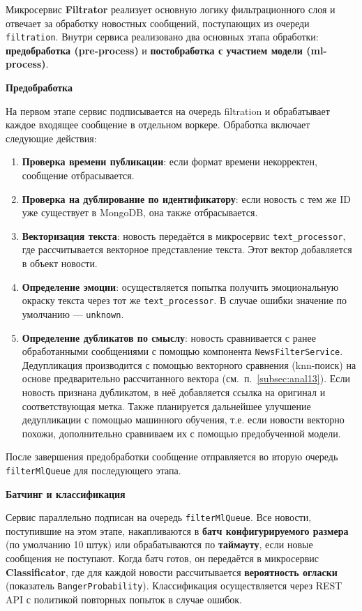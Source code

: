 Микросервис \textbf{Filtrator} реализует основную логику фильтрационного слоя и отвечает за обработку новостных сообщений, поступающих из очереди \texttt{filtration}.
Внутри сервиса реализовано два основных этапа обработки: \textbf{предобработка (pre-process)} и \textbf{постобработка с участием модели (ml-process)}.

\textbf{Предобработка}

На первом этапе сервис подписывается на очередь filtration и обрабатывает каждое входящее сообщение в отдельном воркере. Обработка включает следующие действия:
\begin{enumerate}
    \item \textbf{Проверка времени публикации}: если формат времени некорректен, сообщение отбрасывается.
    \item \textbf{Проверка на дублирование по идентификатору}: если новость с тем же ID уже существует в MongoDB, она также отбрасывается.
    \item \textbf{Векторизация текста}: новость передаётся в микросервис \texttt{text\_processor}, где рассчитывается векторное представление текста. Этот вектор добавляется в объект новости.
    \item \textbf{Определение эмоции}: осуществляется попытка получить эмоциональную окраску текста через тот же \texttt{text\_processor}. В случае ошибки значение по умолчанию — \texttt{unknown}.
    \item \textbf{Определение дубликатов по смыслу}: новость сравнивается с ранее обработанными сообщениями с помощью компонента \texttt{NewsFilterService}.
    Дедупликация производится с помощью векторного сравнения (knn-поиск) на основе предварительно рассчитанного вектора (см.\ п.~\ref{subsec:anal13}).
    Если новость признана дубликатом, в неё добавляется ссылка на оригинал и соответствующая метка.
    Также планируется дальнейшее улучшение дедупликации с помощью машинного обучения, т.е. если новости векторно похожи, дополнительно сравниваем их с помощью предобученной модели.
\end{enumerate}

После завершения предобработки сообщение отправляется во вторую очередь \texttt{filterMlQueue} для последующего этапа.

\textbf{Батчинг и классификация}

Сервис параллельно подписан на очередь \texttt{filterMlQueue}.
Все новости, поступившие на этом этапе, накапливаются в \textbf{батч конфигурируемого размера} (по умолчанию 10 штук) или обрабатываются по \textbf{таймауту}, если новые сообщения не поступают.
Когда батч готов, он передаётся в микросервис \textbf{Classificator}, где для каждой новости рассчитывается \textbf{вероятность огласки} (показатель \texttt{BangerProbability}).
Классификация осуществляется через REST API с политикой повторных попыток в случае ошибок.

